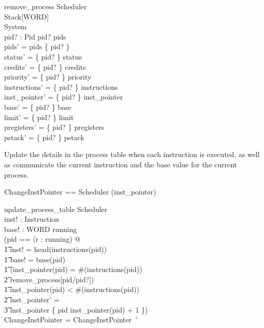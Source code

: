 \documentclass{article}
\begin{document}
\begin{schema}{remove\_process}
  \Delta Scheduler\\
  \Xi Stack[WORD]\\
  \Xi System\\
  pid? : Pid
\where
  pid? \in pids\\
  pids' = pids \setminus \{ pid? \}\\
  status' = \{ pid? \} \ndres status\\
  credits' = \{ pid? \} \ndres credits\\
  priority' = \{ pid? \} \ndres priority\\
  instructions' = \{ pid? \} \ndres instructions\\
  inst\_pointer' = \{ pid? \} \ndres inst\_pointer\\
  base'  = \{ pid? \} \ndres base\\
  limit'  = \{ pid? \} \ndres limit\\
  pregisters' = \{ pid? \} \ndres pregisters\\
  pstack' = \{ pid? \} \ndres pstack
\end{schema}

Update the details in the process table when each instruction is
executed, as well as communicate the current instruction and the base
value for the current process.

\begin{zed}
  ChangeInstPointer == Scheduler \hide (inst\_pointer)
\end{zed}

\begin{schema}{update\_process\_table}
  \Delta Scheduler\\
  inst! : Instruction\\
  base! : WORD
\where
  running \neq \emptyset\\
  (\exists pid == (\mu r : running) @\\
    \t1 inst! = head(instructions(pid)) \land\\
    \t1 base! = base(pid) \land\\
    \t1 (inst\_pointer(pid) = \#(instructions(pid)) \implies\\
      \t2 remove\_process[pid/pid?]) \land\\
    \t1 inst\_pointer(pid) < \#(instructions(pid)) \implies\\
      \t2 inst\_pointer' = \\
        \t3 inst\_pointer \oplus \{ pid \mapsto inst\_pointer(pid) + 1 \})\\
   \theta ChangeInstPointer = \theta ChangeInstPointer~'
\end{schema}
\end{document}
